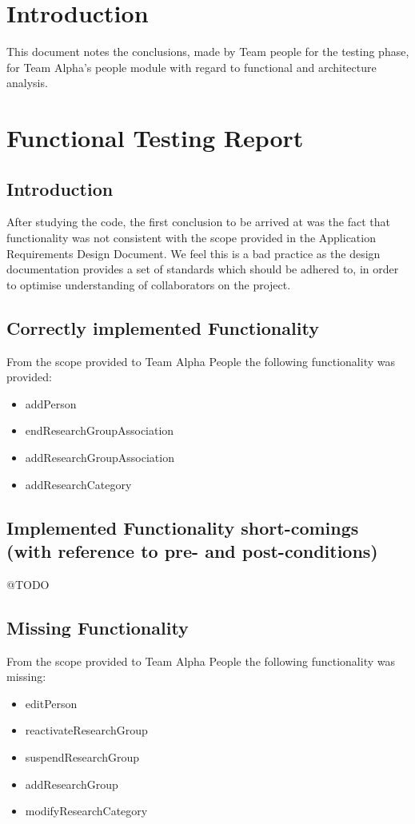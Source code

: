 \documentclass{article}
\begin{document}
\tableofcontents
\thispagestyle{empty}
\cleardoublepage

\setcounter{page}{1}
\section{Introduction}
This document notes the conclusions, made by Team people for the testing phase, for Team Alpha's people module with regard to functional and architecture analysis. \\

\newpage

\section{Functional Testing Report}
	\subsection{Introduction}
	After studying the code, the first conclusion to be arrived at was the fact that functionality was not consistent with the scope provided in the Application Requirements Design Document. We feel this is a bad practice as the design documentation provides a set of standards which should be adhered to, in order to optimise understanding of collaborators on the project.\\

	\subsection{Correctly implemented Functionality}
	From the scope provided to Team Alpha People the following functionality was provided:
	\begin{itemize}
		\item addPerson
		\item endResearchGroupAssociation
		\item addResearchGroupAssociation
		\item addResearchCategory
	\end{itemize}

    \subsection{Implemented Functionality short-comings (with reference to pre- and post-conditions)}
	      @TODO

    \subsection{Missing Functionality}
	From the scope provided to Team Alpha People the following functionality was missing:
	\begin{itemize}
		\item editPerson
		\item reactivateResearchGroup
		\item suspendResearchGroup
		\item addResearchGroup
		\item modifyResearchCategory
	\end{itemize}
\end{document}

